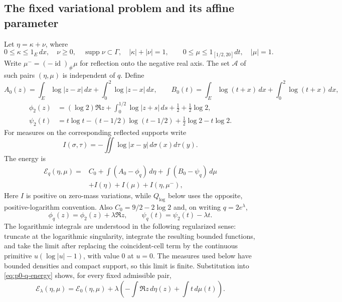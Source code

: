 \subsection{The fixed variational problem and its affine parameter}

Let $\eta=\kappa+\nu$, where
\[
 0\le\kappa\le1_E\,dx,\quad \nu\ge0,\quad
 \operatorname{supp}\nu\subset\Gamma,\quad |\kappa|+|\nu|=1,
\qquad 0\le\mu\le1_{[1/2,20]}dt,\quad |\mu|=1.
\]
Write $\mu^-=(-\operatorname{id})_\#\mu$ for reflection onto the negative
real axis.
The set $\mathcal A$ of such pairs $(\eta,\mu)$ is independent of $q$.
Define
\[
 A_0(z)=\int_E\log|z-x|\,dx+\int_0^2\log|z-x|\,dx,
 \qquad
 B_0(t)=\int_E\log(t+x)\,dx+\int_0^2\log(t+x)\,dx,
\]
\begin{align*}
 \phi_2(z)&=(\log2)\Re z+\int_0^{1/2}\log|z+s|\,ds
                              +\frac12+\frac12\log2,\\
 \psi_2(t)&=t\log t-(t-1/2)\log(t-1/2)
                         +\frac12\log2-t\log2.
\end{align*}
For measures on the corresponding reflected supports write
\[
 I(\sigma,\tau)=-\iint\log|x-y|\,d\sigma(x)d\tau(y).
\]
The energy is
\begin{align}
 \mathcal E_{q}(\eta,\mu)={}&C_0+
     \int(A_0-\phi_q)\,d\eta+\int(B_0-\psi_q)\,d\mu \\
 &+I(\eta)+I(\mu)+I(\eta,\mu^-),
 \label{eq:p0-q-energy}
\end{align}
Here $I$ is positive on zero-mass variations, while $Q_{\log}$ below uses
the opposite, positive-logarithm convention.  Also
$C_0=9/2-2\log2$ and, on writing $q=2e^\lambda$,
\begin{equation}\label{eq:p0-q-fields}
 \phi_q(z)=\phi_2(z)+\lambda\Re z,
 \qquad \psi_q(t)=\psi_2(t)-\lambda t.
\end{equation}
The logarithmic integrals are understood in the following regularized sense:
truncate at the logarithmic singularity, integrate the resulting bounded
functions, and take the limit after replacing the coincident-cell term by
the continuous primitive \(u(\log|u|-1)\), with value \(0\) at \(u=0\).
The measures used below have bounded densities and compact support, so this
limit is finite.  Substitution into
\eqref{eq:p0-q-energy} shows, for every fixed admissible pair,
\begin{equation}\label{eq:p0-q-affine-energy}
 \mathcal E_\lambda(\eta,\mu)=\mathcal E_0(\eta,\mu)
       +\lambda\left(-\int\Re z\,d\eta(z)+\int t\,d\mu(t)\right).
\end{equation}

